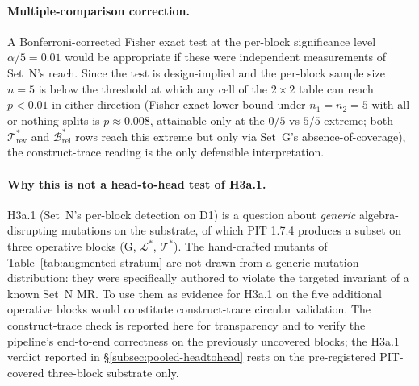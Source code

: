 \paragraph{Multiple-comparison correction.}
A Bonferroni-corrected Fisher exact test at the per-block
significance level $\alpha / 5 = 0.01$ would be appropriate if these
were independent measurements of Set~N's reach. Since the test is
design-implied and the per-block sample size $n = 5$ is below the
threshold at which any cell of the $2 \times 2$ table can reach
$p < 0.01$ in either direction (Fisher exact lower bound under
$n_{1} = n_{2} = 5$ with all-or-nothing splits is $p \approx 0.008$,
attainable only at the
$0/5$-vs-$5/5$ extreme; both
$\mathcal{T}^{*}_{\mathrm{rev}}$ and
$\mathcal{B}^{*}_{\mathrm{rel}}$ rows reach this extreme but only
via Set~G's absence-of-coverage), the construct-trace reading is
the only defensible interpretation.

\paragraph{Why this is not a head-to-head test of H3a.1.}
\label{para:construct-trace-not-headtohead}
H3a.1 (Set~N's per-block detection on D1) is a question about
\emph{generic} algebra-disrupting mutations on the substrate, of
which PIT 1.7.4 produces a subset on three operative blocks (G,
$\mathcal{L}^{*}$, $\mathcal{T}^{*}$). The hand-crafted mutants of
Table~\ref{tab:augmented-stratum} are not drawn from a generic
mutation distribution: they were specifically authored to violate
the targeted invariant of a known Set~N MR. To use them as
evidence for H3a.1 on the five additional operative blocks would
constitute construct-trace circular validation. The
construct-trace check is reported here for transparency and to
verify the pipeline's end-to-end correctness on the previously
uncovered blocks; the H3a.1 verdict reported in
\S\ref{subsec:pooled-headtohead} rests on the pre-registered
PIT-covered three-block substrate only.

